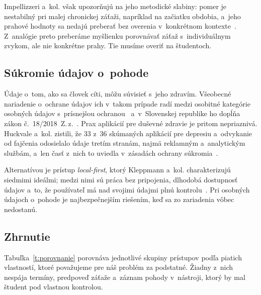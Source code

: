 \documentclass[10pt,twoside,slovak,a4paper]{article}
\begin{document}
Impellizzeri a~kol. však upozorňujú na jeho metodické slabiny: pomer je
nestabilný pri malej chronickej záťaži, napríklad na začiatku obdobia,
a~jeho prahové hodnoty sa nedajú preberať bez overenia v~konkrétnom
kontexte~\cite{Impellizzeri:ACWR}. Z~analógie preto preberáme myšlienku
porovnávať záťaž s~individuálnym zvykom, ale nie konkrétne prahy. Tie
musíme overiť na študentoch.

\subsection{Súkromie údajov o~pohode}

Údaje o~tom, ako sa človek cíti, môžu súvisieť s~jeho zdravím. Všeobecné
nariadenie o~ochrane údajov ich v~takom prípade radí medzi osobitné kategórie
osobných údajov s~prísnejšou ochranou~\cite{GDPR} a~v~Slovenskej republike
ho dopĺňa zákon č.~18/2018~Z.\,z.~\cite{Zakon18}. Prax aplikácií pre duševné
zdravie je pritom nepriaznivá. Huckvale a~kol. zistili, že 33 z~36
skúmaných aplikácií pre depresiu a~odvykanie od fajčenia odosielalo údaje
tretím stranám, najmä reklamným a~analytickým službám, a~len časť z~nich to
uviedla v~zásadách ochrany súkromia~\cite{Huckvale:Privacy}.

Alternatívou je prístup \emph{local-first}, ktorý Kleppmann a~kol.
charakterizujú siedmimi ideálmi; medzi nimi sú práca bez pripojenia,
dlhodobá dostupnosť údajov a~to, že používateľ má nad svojimi údajmi
plnú kontrolu~\cite{Kleppmann:LocalFirst}. Pri osobných údajoch o~pohode je
najbezpečnejším riešením, keď sa zo zariadenia vôbec nedostanú.

\subsection{Zhrnutie}

Tabuľka~\ref{t:porovnanie} porovnáva jednotlivé skupiny prístupov podľa
piatich vlastností, ktoré považujeme pre náš problém za podstatné. Žiadny
z~nich nespája termíny, predpoveď záťaže a~záznam pohody v~nástroji, ktorý by
mal študent pod vlastnou kontrolou.
\end{document}
